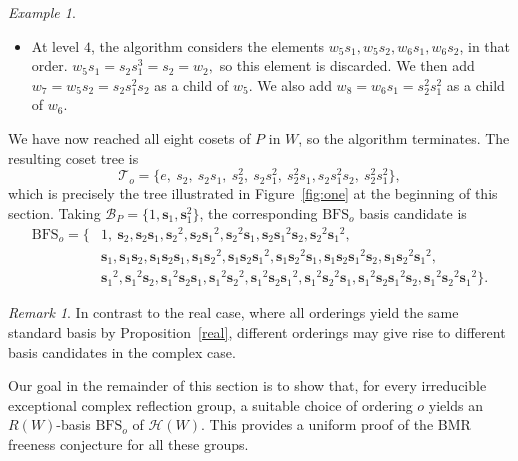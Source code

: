 \documentclass[11pt, reqno]{amsart}
\newcommand{\cH}{\mathcal{H}}
\newcommand{\bs}{\mathbf{s}}
\newcommand{\BFS}{\mathrm{BFS}}
\numberwithin{equation}{section}
\theoremstyle{remark}
\newtheorem{remark}[theorem]{Remark}
\newtheorem{example}[theorem]{Example}
\begin{document}
\begin{example}
\begin{itemize}
				\item At level $4$, the algorithm considers the elements $w_5s_1,w_5s_2, w_6s_1,w_6s_2$, in that order. 
				$
				w_5s_1=s_2s_1^3=s_2=w_2,
				$
				so this element is discarded. We then add
				$
				w_7=w_5s_2=s_2s_1^2s_2
				$ as 	a child of $w_5$.	
				We also add
				$
				w_8=w_6s_1=s_2^2s_1^2
				$ as a child of $w_6$.
			\end{itemize}		
		We have now reached all eight cosets of $P$ in $W$, so the algorithm terminates. The resulting coset tree is
			\[
			\mathcal T_o=
			\{e,\ s_2,\ s_2s_1,\ s_2^2,\ s_2s_1^2,\ s_2^2s_1,
			s_2s_1^2s_2,\ s_2^2s_1^2\},
			\]
			which is precisely the tree illustrated in Figure~\ref{fig:one} at the beginning of this section.
			Taking $\mathcal{B}_P=\{1,\bs_1,\bs_1^2\}$, the corresponding $\BFS_o$ basis candidate is
			\[
			\begin{aligned}
				\BFS_o=\big\{&
				1,\ {\mathbf{s}_2},
				{\mathbf{s}_2}{\mathbf{s}_1},
				{\mathbf{s}_2}^2,
				{\mathbf{s}_2}{\mathbf{s}_1}^2,
				{\mathbf{s}_2}^2{\mathbf{s}_1},
				{\mathbf{s}_2}{\mathbf{s}_1}^2{\mathbf{s}_2},
				{\mathbf{s}_2}^2{\mathbf{s}_1}^2,\\
				&
				{\mathbf{s}_1},
				{\mathbf{s}_1}{\mathbf{s}_2},
				{\mathbf{s}_1}{\mathbf{s}_2}{\mathbf{s}_1},
				{\mathbf{s}_1}{\mathbf{s}_2}^2,
				{\mathbf{s}_1}{\mathbf{s}_2}{\mathbf{s}_1}^2,
				{\mathbf{s}_1}{\mathbf{s}_2}^2{\mathbf{s}_1},
				{\mathbf{s}_1}{\mathbf{s}_2}{\mathbf{s}_1}^2{\mathbf{s}_2},
				{\mathbf{s}_1}{\mathbf{s}_2}^2{\mathbf{s}_1}^2,\\
				&
				{\mathbf{s}_1}^2,
				{\mathbf{s}_1}^2{\mathbf{s}_2},
				{\mathbf{s}_1}^2{\mathbf{s}_2}{\mathbf{s}_1},
				{\mathbf{s}_1}^2{\mathbf{s}_2}^2,
				{\mathbf{s}_1}^2{\mathbf{s}_2}{\mathbf{s}_1}^2,
				{\mathbf{s}_1}^2{\mathbf{s}_2}^2{\mathbf{s}_1},
				{\mathbf{s}_1}^2{\mathbf{s}_2}{\mathbf{s}_1}^2{\mathbf{s}_2},
				{\mathbf{s}_1}^2{\mathbf{s}_2}^2{\mathbf{s}_1}^2
				\big\}.
			\end{aligned}	
			\]
		\end{example}
		
		\begin{remark}In contrast to the real case, where all orderings yield the same standard basis by Proposition~\ref{real}, different orderings may give rise to different basis candidates in the complex case.
		\end{remark}
		
		Our goal in the remainder of this section is to show that, for every irreducible exceptional complex reflection group, a suitable choice of ordering $o$ yields an $R(W)$-basis $\BFS_o$ of $\cH(W)$. This provides a uniform proof of the BMR freeness conjecture for all these groups.
		
\end{document}
